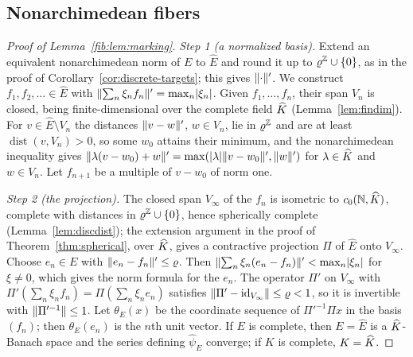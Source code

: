 \subsection{Nonarchimedean fibers}\label{frc:ssec:nonarch}
\begin{proof}[Proof of Lemma~\ref{fib:lem:marking}]
\emph{Step 1 (a normalized basis).} Extend an equivalent nonarchimedean norm of $E$ to $\widehat E$ and round it up to
$\varrho^\mathbb Z\cup\{0\}$, as in the proof of Corollary~\ref{cor:discrete-targets}; this gives $\lVert \cdot\rVert'$. We construct
$f_1,f_2,\dots\in\widehat E$ with $\lVert \sum_n\xi_nf_n\rVert'=\max_n\lvert \xi_n\rvert$. Given $f_1,\dots,f_n$, their span $V_n$ is
closed, being finite-dimensional over the complete field $\widehat K$ (Lemma~\ref{lem:findim}). For $v\in\widehat E\setminus V_n$
the distances $\lVert v-w\rVert'$, $w\in V_n$, lie in $\varrho^\mathbb Z$ and are at least $\operatorname{dist}(v,V_n)>0$, so some
$w_0$ attains their minimum, and the nonarchimedean inequality gives
$\lVert \lambda(v-w_0)+w\rVert'=\max(\lvert \lambda\rvert\lVert v-w_0\rVert',\lVert w\rVert')$ for $\lambda\in\widehat K$ and $w\in V_n$. Let $f_{n+1}$ be a
multiple of $v-w_0$ of norm one.

\emph{Step 2 (the projection).} The closed span $V_\infty$ of the $f_n$ is isometric to $c_0(\mathbb N,\widehat K)$, complete with
distances in $\varrho^\mathbb Z\cup\{0\}$, hence spherically complete (Lemma~\ref{lem:discdist}); the extension argument in the
proof of Theorem~\ref{thm:spherical}, over $\widehat K$, gives a contractive projection $\Pi$ of $\widehat E$ onto $V_\infty$.
Choose $e_n\in E$ with $\lVert e_n-f_n\rVert'\le\varrho$. Then $\lVert \sum_n\xi_n(e_n-f_n)\rVert'<\max_n\lvert \xi_n\rvert$ for $\xi\ne0$,
which gives the norm formula for the $e_n$. The operator $\Pi'$ on $V_\infty$ with
$\Pi'(\sum_n\xi_nf_n)=\Pi(\sum_n\xi_ne_n)$ satisfies $\lVert \Pi'-\mathrm{id}_{V_\infty}\rVert\le\varrho<1$, so it is invertible with
$\lVert \Pi'^{-1}\rVert\le1$. Let $\theta_E(x)$ be the coordinate sequence of $\Pi'^{-1}\Pi x$ in the basis $(f_n)$; then
$\theta_E(e_n)$ is the $n$th unit vector. If $E$ is complete, then $E=\widehat E$ is a $\widehat K$\nobreakdash-Banach space and
the series defining $\widehat\psi_E$ converge; if $K$ is complete, $K=\widehat K$.
\end{proof}

